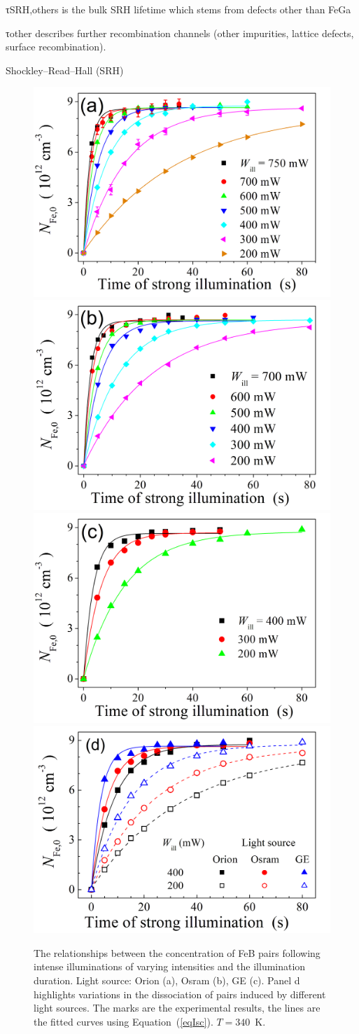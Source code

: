 \documentclass{WileyMSP-template}
\begin{document}
τSRH,others is the bulk SRH lifetime which stems from defects other than FeGa

τother describes further
recombination channels (other impurities, lattice defects, surface
recombination).

Shockley–Read–Hall (SRH)

\begin{figure}
\centering
  \includegraphics[width=0.4\linewidth]{Fig3a.png}
  \includegraphics[width=0.4\linewidth]{Fig3b.png}
  \includegraphics[width=0.4\linewidth]{Fig3c.png}
  \includegraphics[width=0.4\linewidth]{Fig3d.png}
  \caption{The relationships between the concentration of FeB pairs following intense illuminations of varying intensities and the illumination duration.
  Light source: Orion (a), Osram (b), GE (c).
  Panel d highlights variations in the dissociation of pairs induced by different light sources.
  The marks are the experimental results, the lines are the fitted curves using Equation~(\ref{eqIsc}).
  $T=340$~K.}
  \label{fig3}
\end{figure}
\end{document}
